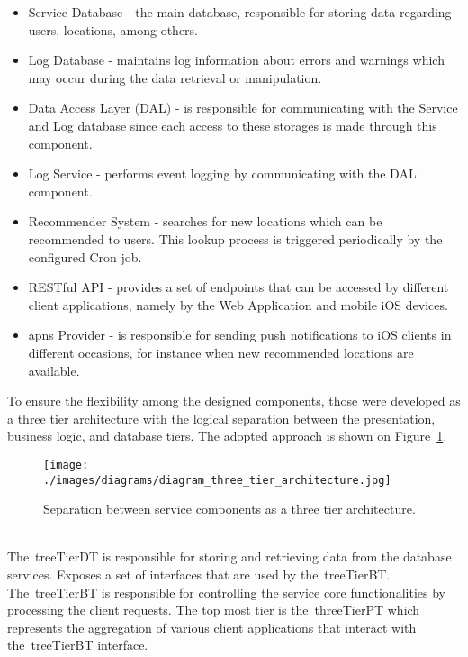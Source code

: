 \begin{itemize}
\item Service Database - the main database, responsible for storing data regarding users, locations, among others.
\item Log Database - maintains log information about errors and warnings which may occur during the data retrieval or manipulation.
\\
\item Data Access Layer (DAL) - is responsible for communicating with the Service and Log database since each access to these storages is made through this component. 
\item Log Service - performs event logging by communicating with the DAL component.
\\
\item Recommender System - searches for new locations which can be recommended to users. This lookup process is triggered periodically by the configured Cron job.
\item RESTful API - provides a set of endpoints that can be accessed by different client applications, namely by the Web Application and mobile iOS devices.
\item \gls{apns} Provider - is responsible for sending push notifications to iOS clients in different occasions, for instance when new recommended locations are available.
\end{itemize}
To ensure the flexibility among the designed components, those were developed as a three tier architecture with the logical separation between the presentation, business logic, and database tiers. The adopted approach is shown on Figure~\ref{fig:threeTierArchitecture}.\\
\begin{figure}[h!]
 \centering
   \texttt{[image: ./images/diagrams/diagram\_three\_tier\_architecture.jpg]}
   \caption{Separation between service components as a three tier architecture.}
   \label{fig:threeTierArchitecture}
\end{figure}\\
The~\gls{treeTierDT} is responsible for storing and retrieving data from the database services. Exposes a set of interfaces that are used by the~\gls{treeTierBT}. The~\gls{treeTierBT} is responsible for controlling the service core functionalities by processing the client requests. The top most tier is the~\gls{threeTierPT} which represents the aggregation of various client applications that interact with the~\gls{treeTierBT} interface.\\
